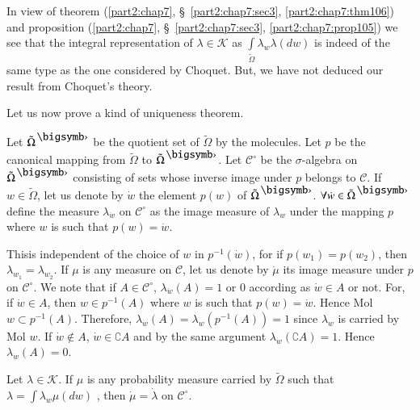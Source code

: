 In view of theorem (\ref{part2:chap7}, \S\ \ref{part2:chap7:sec3},
\ref{part2:chap7:thm106}) and proposition (\ref{part2:chap7},
\S\ \ref{part2:chap7:sec3}, \ref{part2:chap7:prop105})  
we see that the integral representation of $\lambda \in \mathscr{K}$
as $\int\limits_{\tilde{\Omega}} \lambda_w \lambda(dw)$ is indeed of
the same type as the one considered by Choquet. But, we have not
deduced our result from Choquet's theory. 

Let us now prove a kind of uniqueness theorem.

Let $\tilde{\Omega}^\bigdot$ be the quotient set of $\tilde{\Omega}$
by the molecules. Let $p$ be the canonical mapping from
$\tilde{\Omega}$ to $\tilde{\Omega}^\bigdot$. Let $\mathscr{C}^\circ$
be the $\sigma$-algebra on  $\tilde{\Omega}^\bigdot$ consisting of
sets whose inverse image under $p$ belongs to $\mathscr{C}$. If $w \in
\tilde{\Omega}$, let us denote by $\dot{w}$ the element $p(w)$ of
$\tilde{\Omega}^\bigdot$. $\forall \dot{w} \in
\tilde{\Omega}^{\bigdot}$ define the measure $\lambda_{\dot{w}}$ on
$\mathscr{C}^\circ$ as the image measure of $\lambda_w$ under the
mapping $p$ where $w$ is such that $p(w) =\dot{w}$. 

This\pageoriginale is independent of the choice of $w$ in
$p^{-1}(\dot{w})$, for if $p(w_1) = p(w_2)$, then $\lambda_{w_1} =
\lambda_{w_2}$. If $\mu$ is any measure on $\mathscr{C}$, let us
denote by $\dot{\mu}$ its image measure under $p$ on
$\mathscr{C}^\circ$. We note that if $A \in \mathscr{C}^\circ$,
$\lambda_{\dot{w}} (A) = 1$ or $0$ according as $\dot{w} \in A$ or
not. For, if $\dot{w} \in A$, then $w \in p^{-1}(A)$ where $w$ is such
that $p(w) = \dot{w}$. Hence Mol $w \subset p^{-1} (A)$. Therefore,
$\lambda_{\dot{w}}(A) = \lambda_w(p^{-1} (A)) =1 $ since $\lambda_w$
is carried by Mol $w$. If $\dot{w} \not\in A$, $\dot{w} \in
\complement A$ and by the same argument $\lambda_{\dot{w}}
(\complement A) = 1$. Hence $\lambda_{\dot{w}} (A) =0$. 

\begin{thm}\label{part2:chap7:thm107}
Let $\lambda \in \mathscr{K}$. If $\mu$ is any probability measure
carried by $\tilde{\Omega}$ such that $\lambda = \int \lambda_w \mu
(dw)$ , then $\dot{\mu} = \dot{\lambda}$ on $\mathscr{C}^\circ$.
\end{thm}

